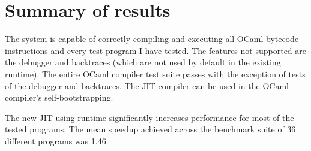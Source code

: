 \section{Summary of results}

The system is capable of correctly compiling and executing all OCaml
bytecode instructions and every test program I have tested. The features not supported are
the debugger and backtraces (which are not used by default in the existing runtime). The entire
OCaml compiler test suite passes with the exception of tests of
the debugger and backtraces. The JIT compiler can be used in the OCaml compiler's
self-bootstrapping.

The new JIT-using runtime significantly increases performance for most of the tested programs.
The mean speedup achieved across the benchmark suite of 36 different programs was 1.46.